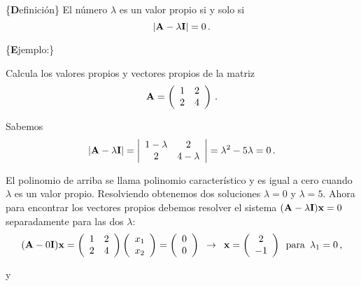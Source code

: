 \documentclass[
]{agujournal2019}
\begin{document}
\vspace{0.5cm}

\{\noindent \textbf Definición\} El número \(\lambda\) es un valor
propio si y solo si \[|{\textbf A}-\lambda{\textbf I}|=0\,.\]

\vspace{0.5cm}

\{\noindent \textbf Ejemplo:\}

\noindent Calcula los valores propios y vectores propios de la matriz
\[{\textbf A}=\left(\begin{array}{ccccc}
  1 & 2\\
  2 & 4\\
        \end{array}\right)\,.\]

\noindent Sabemos
\[|{\textbf A}-\lambda{\textbf I}|=\left|\begin{array}{ccccc}
  1-\lambda & 2\\
  2 & 4-\lambda\\
        \end{array}\right|=\lambda^2-5\lambda=0\,.\]

\noindent El polinomio de arriba se llama polinomio característico y es
igual a cero cuando \(\lambda\) es un valor propio. Resolviendo
obtenemos dos soluciones \(\lambda=0\) y \(\lambda=5\). Ahora para
encontrar los vectores propios debemos resolver el sistema
\(({\textbf A}-\lambda{\textbf I}){\textbf x}=0\) separadamente para las
dos \(\lambda\): \[({\textbf A}-0{\textbf I}){\textbf x}=
\left(\begin{array}{ccccc}
  1 & 2\\
  2 & 4\\
      \end{array}\right)
      \left(\begin{array}{c}
  x_1 \\
  x_2 \\
      \end{array}\right)=
      \left(\begin{array}{c}
  0 \\
  0 \\
      \end{array}\right)\,\,\,\rightarrow\,\,\,{\textbf x}=\left(\begin{array}{c}
  2 \\
  -1 \\
      \end{array}\right)\,\,\,{\rm para}\,\,\,\lambda_1=0\,,\]

y
\end{document}
